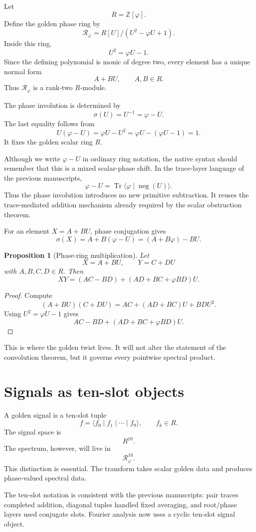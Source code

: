 \documentclass[11pt]{article}
\newtheorem{proposition}[definition]{Proposition}
\newcommand{\Tr}{\operatorname{Tr}}
\newcommand{\ph}{\varphi}
\newcommand{\Z}{\mathbb{Z}}
\newcommand{\RR}{\mathcal R_\ph}
\newcommand{\sig}{\sigma}
\begin{document}
Let
\[
    R=\Z[\ph].
\]
Define the golden phase ring by
\[
    \RR=R[U]/(U^2-\ph U+1).
\]
Inside this ring,
\[
    U^2=\ph U-1.
\]
Since the defining polynomial is monic of degree two, every element has a unique normal form
\[
    A+BU,
    \qquad A,B\in R.
\]
Thus $\RR$ is a rank-two $R$-module.

The phase involution is determined by
\[
    \sig(U)=U^{-1}=\ph-U.
\]
The last equality follows from
\[
    U(\ph-U)=\ph U-U^2=\ph U-(\ph U-1)=1.
\]
It fixes the golden scalar ring $R$.

Although we write $\ph-U$ in ordinary ring notation, the native syntax should remember that this is a mixed scalar-phase shift.  In the trace-layer language of the previous manuscripts,
\[
    \ph-U=\Tr\langle \ph\mid \operatorname{neg}(U)\rangle.
\]
Thus the phase involution introduces no new primitive subtraction.  It reuses the trace-mediated addition mechanism already required by the scalar obstruction theorem.

For an element $X=A+BU$, phase conjugation gives
\[
    \sig(X)=A+B(\ph-U)=(A+B\ph)-BU.
\]

\begin{proposition}[Phase-ring multiplication]
Let
\[
    X=A+BU,
    \qquad
    Y=C+DU
\]
with $A,B,C,D\in R$.  Then
\[
    XY=(AC-BD)+(AD+BC+\ph BD)U.
\]
\end{proposition}

\begin{proof}
Compute
\[
    (A+BU)(C+DU)=AC+(AD+BC)U+BDU^2.
\]
Using $U^2=\ph U-1$ gives
\[
    AC-BD+(AD+BC+\ph BD)U.
\]
\end{proof}

This is where the golden twist lives.  It will not alter the statement of the convolution theorem, but it governs every pointwise spectral product.

\section{Signals as ten-slot objects}

A golden signal is a ten-slot tuple
\[
    f=\langle f_0\mid f_1\mid\cdots\mid f_9\rangle,
    \qquad
    f_k\in R.
\]
The signal space is
\[
    R^{10}.
\]
The spectrum, however, will live in
\[
    \RR^{10}.
\]
This distinction is essential.  The transform takes scalar golden data and produces phase-valued spectral data.

The ten-slot notation is consistent with the previous manuscripts: pair traces completed addition, diagonal tuples handled fixed averaging, and root/phase layers used conjugate slots.  Fourier analysis now uses a cyclic ten-slot signal object.
\end{document}
